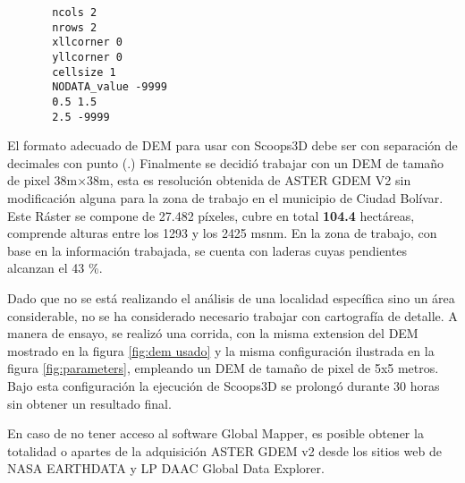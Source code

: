 \newpage
\begin{verbatim}
	   ncols 2
	   nrows 2
	   xllcorner 0
	   yllcorner 0
	   cellsize 1
	   NODATA_value -9999
	   0.5 1.5
	   2.5 -9999
\end{verbatim}


El formato adecuado de DEM para usar con Scoops3D debe ser con separaci\'{o}n de
decimales con punto (.)
Finalmente se decidi\'{o} trabajar con un DEM de tama\~no de pixel 38m$\times$38m, esta es
resoluci\'{o}n obtenida de ASTER GDEM V2 sin modificaci\'on alguna para la zona de trabajo en el municipio de Ciudad Bol\'{i}var.
Este R\'aster se compone de 27.482 p\'ixeles, cubre en total \textbf{104.4 } hect\'areas,
comprende alturas entre los 1293 y los 2425 msnm.
En la zona de trabajo, con base en la informaci\'{o}n trabajada, se cuenta con laderas cuyas
pendientes alcanzan el 43 \%.

Dado que no se est\'a realizando el an\'alisis de una localidad espec\'ifica sino un \'area considerable, no se ha considerado necesario trabajar con cartograf\'ia de detalle. A manera de ensayo, se realiz\'o una corrida, con la misma extension del DEM mostrado en la figura \ref{fig:dem usado} y la misma configuraci\'on ilustrada en la figura \ref{fig:parameters}, empleando un DEM de tama\~no de pixel de 5x5 metros.
Bajo esta configuraci\'on la ejecuci\'on de Scoops3D se prolong\'o durante 30 horas sin obtener un resultado final.

En caso de no tener acceso al software Global Mapper, es posible obtener la totalidad o apartes  de la adquisici\'on  ASTER GDEM v2 desde los sitios web de NASA EARTHDATA y LP DAAC Global Data Explorer.